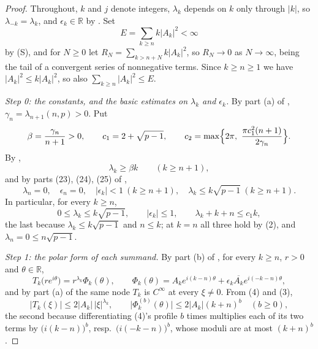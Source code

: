 \begin{proof}
Throughout, $k$ and $j$ denote integers, $\lambda_k$ depends on $k$ only
through $|k|$, so $\lambda_{-k}=\lambda_k$, and $\epsilon_k\in\mathbb{R}$ by
.  Set
\[
  E=\sum_{k\ge n}k|A_k|^2<\infty
\]
by (S), and for $N\ge0$ let $R_N=\sum_{k>n+N}k|A_k|^2$, so $R_N\to0$ as
$N\to\infty$, being the tail of a convergent series of nonnegative terms.
Since $k\ge n\ge1$ we have $|A_k|^2\le k|A_k|^2$, so also
$\sum_{k\ge n}|A_k|^2\le E$.

\emph{Step 0: the constants, and the basic estimates on $\lambda_k$ and
$\epsilon_k$.}  By part (a) of ,
$\gamma_n=\lambda_{n+1}(n,p)>0$.  Put
\[
  \beta=\frac{\gamma_n}{n+1}>0,\qquad c_1=2+\sqrt{p-1},\qquad
  c_2=\max\Bigl\{2\pi,\ \frac{\pi c_1^2(n+1)}{2\gamma_n}\Bigr\}.
\]
By ,
\begin{equation}\tag{1}
  \lambda_k\ge\beta k\qquad(k\ge n+1),
\end{equation}
and by parts (23), (24), (25) of ,
\begin{equation}\tag{2}
  \lambda_n=0,\quad\epsilon_n=0,\quad|\epsilon_k|<1\ (k\ge n+1),\quad
  \lambda_k\le k\sqrt{p-1}\ (k\ge n+1).
\end{equation}
In particular, for every $k\ge n$,
\begin{equation}\tag{3}
  0\le\lambda_k\le k\sqrt{p-1},\qquad |\epsilon_k|\le1,\qquad
  \lambda_k+k+n\le c_1k ,
\end{equation}
the last because $\lambda_k\le k\sqrt{p-1}$ and $n\le k$; at $k=n$ all three
hold by (2), and $\lambda_n=0\le n\sqrt{p-1}$.

\emph{Step 1: the polar form of each summand.}  By part (b) of
, for every $k\ge n$, $r>0$ and
$\theta\in\mathbb{R}$,
\begin{equation}\tag{4}
  T_k\bigl(re^{i\theta}\bigr)=r^{\lambda_k}\Phi_k(\theta),\qquad
  \Phi_k(\theta)=A_ke^{i(k-n)\theta}+\epsilon_k\overline{A_k}e^{i(-k-n)\theta},
\end{equation}
and by part (a) of the same node $T_k$ is $C^\infty$ at every $\xi\neq0$.  From
(4) and (3),
\begin{equation}\tag{5}
  |T_k(\xi)|\le2|A_k|\,|\xi|^{\lambda_k},\qquad
  \bigl|\Phi_k^{(b)}(\theta)\bigr|\le2|A_k|(k+n)^{b}\quad(b\ge0),
\end{equation}
the second because differentiating (4)'s profile $b$ times multiplies each of
its two terms by $\bigl(i(k-n)\bigr)^{b}$, resp.\ $\bigl(i(-k-n)\bigr)^{b}$,
whose moduli are at most $(k+n)^b$.


\end{proof}
